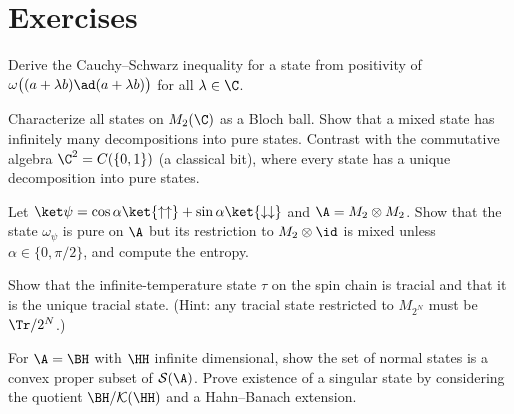 \section*{Exercises}
\begin{exercise}
Derive the Cauchy--Schwarz inequality for a state from positivity of $\omega\big((a+\lambda b)\ad(a+\lambda b)\big)$ for all $\lambda\in\C$.
\end{exercise}
\begin{exercise}
Characterize all states on $M_2(\C)$ as a Bloch ball. Show that a mixed state has infinitely many decompositions into pure states. Contrast with the commutative algebra $\C^2=C(\{0,1\})$ (a classical bit), where every state has a unique decomposition into pure states.
\end{exercise}
\begin{exercise}
Let $\ket\psi=\cos\alpha\ket{\uparrow\uparrow}+\sin\alpha\ket{\downarrow\downarrow}$ and $\A=M_2\otimes M_2$. Show that the state $\omega_\psi$ is pure on $\A$ but its restriction to $M_2\otimes\id$ is mixed unless $\alpha\in\{0,\pi/2\}$, and compute the entropy.
\end{exercise}
\begin{exercise}
Show that the infinite-temperature state $\tau$ on the spin chain is tracial and that it is the unique tracial state. (Hint: any tracial state restricted to $M_{2^N}$ must be $\Tr/2^N$.)
\end{exercise}
\begin{exercise}
For $\A=\BH$ with $\HH$ infinite dimensional, show the set of normal states is a convex proper subset of $\mathcal S(\A)$. Prove existence of a singular state by considering the quotient $\BH/\mathcal K(\HH)$ and a Hahn--Banach extension.
\end{exercise}
